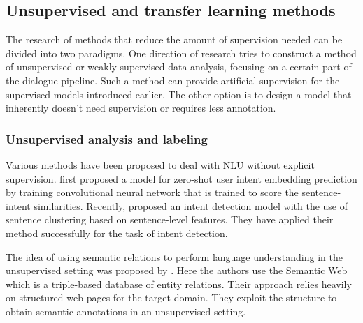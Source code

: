 \subsection{Unsupervised and transfer learning methods}
\label{sec:relwork-unsup}
The research of methods that reduce the amount of supervision needed can be divided into two paradigms.
One direction of research tries to construct a method of unsupervised or weakly supervised data analysis, focusing on a certain part of the dialogue pipeline.
Such a method can provide artificial supervision for the supervised models introduced earlier.
The other option is to design a model that inherently doesn't need supervision or requires less annotation.

\subsubsection{Unsupervised analysis and labeling}
Various methods have been proposed to deal with NLU without explicit supervision.
\citet{chen2016zero} first proposed a model for zero-shot user intent embedding prediction by training convolutional neural network that is trained to score the sentence-intent similarities.
Recently, \citet{shi2018auto} proposed an intent detection model with the use of sentence clustering based on sentence-level features.
They have applied their method successfully for the task of intent detection.

The idea of using semantic relations to perform language understanding in the unsupervised setting was proposed by \citet{heck2012exploiting}.
Here the authors use the Semantic Web \cite{berners2001semantic} which is a triple-based database of entity relations.
Their approach relies heavily on structured web pages for the target domain.
They exploit the structure to obtain semantic annotations in an unsupervised setting.


